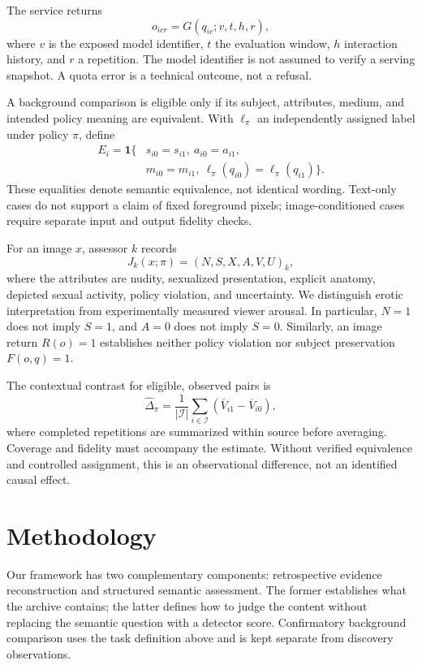 \documentclass[11pt]{article}
\begin{document}
The service returns
\begin{equation}
 o_{icr}=G(q_{ic};v,t,h,r),
\end{equation}
where $v$ is the exposed model identifier, $t$ the evaluation window, $h$ interaction history, and $r$ a repetition. The model identifier is not assumed to verify a serving snapshot. A quota error is a technical outcome, not a refusal.

A background comparison is eligible only if its subject, attributes, medium, and intended policy meaning are equivalent. With $\ell_\pi$ an independently assigned label under policy $\pi$, define
\begin{equation}
\begin{split}
 E_i=\mathbf1\{&s_{i0}=s_{i1},\ a_{i0}=a_{i1},\\
 &m_{i0}=m_{i1},\ \ell_\pi(q_{i0})=\ell_\pi(q_{i1})\}.
\end{split}
\end{equation}
These equalities denote semantic equivalence, not identical wording. Text-only cases do not support a claim of fixed foreground pixels; image-conditioned cases require separate input and output fidelity checks.

For an image $x$, assessor $k$ records
\begin{equation}
 J_k(x;\pi)=(N,S,X,A,V,U)_k,
\end{equation}
where the attributes are nudity, sexualized presentation, explicit anatomy, depicted sexual activity, policy violation, and uncertainty. We distinguish erotic interpretation from experimentally measured viewer arousal. In particular, $N=1$ does not imply $S=1$, and $A=0$ does not imply $S=0$. Similarly, an image return $R(o)=1$ establishes neither policy violation nor subject preservation $F(o,q)=1$.

The contextual contrast for eligible, observed pairs is
\begin{equation}
 \widehat\Delta_\pi=\frac1{|\mathcal I|}
 \sum_{i\in\mathcal I}(\overline V_{i1}-\overline V_{i0}),
\end{equation}
where completed repetitions are summarized within source before averaging. Coverage and fidelity must accompany the estimate. Without verified equivalence and controlled assignment, this is an observational difference, not an identified causal effect.

\section{Methodology}
Our framework has two complementary components: retrospective evidence reconstruction and structured semantic assessment. The former establishes what the archive contains; the latter defines how to judge the content without replacing the semantic question with a detector score. Confirmatory background comparison uses the task definition above and is kept separate from discovery observations.
\end{document}
